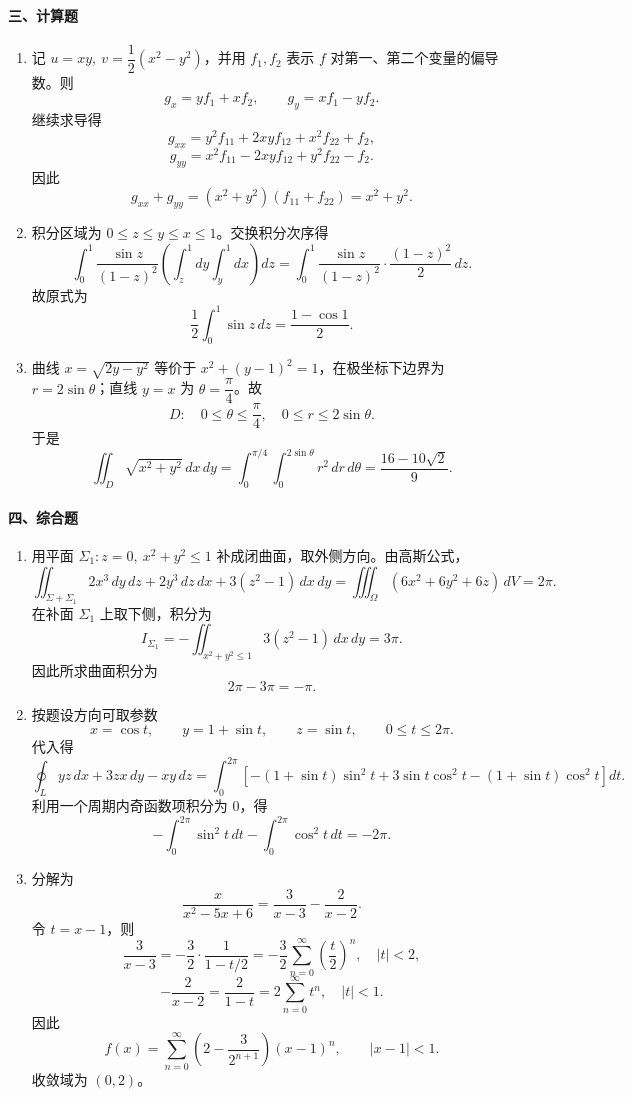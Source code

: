 \paragraph*{三、计算题}
\begin{enumerate}
  \item 记 $u=xy,\ v=\dfrac12(x^2-y^2)$，并用 $f_1,f_2$ 表示 $f$ 对第一、第二个变量的偏导数。则
  \[
    g_x=yf_1+xf_2,\qquad g_y=xf_1-yf_2.
  \]
  继续求导得
  \[
    g_{xx}=y^2f_{11}+2xyf_{12}+x^2f_{22}+f_2,
  \]
  \[
    g_{yy}=x^2f_{11}-2xyf_{12}+y^2f_{22}-f_2.
  \]
  因此
  \[
    g_{xx}+g_{yy}=(x^2+y^2)(f_{11}+f_{22})=x^2+y^2.
  \]
  \item 积分区域为 $0\le z\le y\le x\le 1$。交换积分次序得
  \[
    \int_0^1\frac{\sin z}{(1-z)^2}
    \left(\int_z^1dy\int_y^1dx\right)dz
    =
    \int_0^1\frac{\sin z}{(1-z)^2}\cdot\frac{(1-z)^2}{2}\,dz.
  \]
  故原式为
  \[
    \frac12\int_0^1\sin z\,dz=\frac{1-\cos 1}{2}.
  \]
  \item 曲线 $x=\sqrt{2y-y^2}$ 等价于 $x^2+(y-1)^2=1$，在极坐标下边界为 $r=2\sin\theta$；直线 $y=x$ 为 $\theta=\dfrac{\pi}{4}$。故
  \[
    D:\quad 0\le \theta\le \frac{\pi}{4},\quad 0\le r\le 2\sin\theta.
  \]
  于是
  \[
    \iint_D\sqrt{x^2+y^2}\,dx\,dy
    =
    \int_0^{\pi/4}\int_0^{2\sin\theta}r^2\,dr\,d\theta
    =
    \frac{16-10\sqrt2}{9}.
  \]
\end{enumerate}

\paragraph*{四、综合题}
\begin{enumerate}
  \item 用平面 $\Sigma_1:z=0,\ x^2+y^2\le 1$ 补成闭曲面，取外侧方向。由高斯公式，
  \[
    \iint_{\Sigma+\Sigma_1}2x^3\,dy\,dz+2y^3\,dz\,dx+3(z^2-1)\,dx\,dy
    =
    \iiint_\Omega (6x^2+6y^2+6z)\,dV=2\pi.
  \]
  在补面 $\Sigma_1$ 上取下侧，积分为
  \[
    I_{\Sigma_1}=-\iint_{x^2+y^2\le 1}3(z^2-1)\,dx\,dy=3\pi.
  \]
  因此所求曲面积分为
  \[
    2\pi-3\pi=-\pi.
  \]
  \item 按题设方向可取参数
  \[
    x=\cos t,\qquad y=1+\sin t,\qquad z=\sin t,\qquad 0\le t\le 2\pi.
  \]
  代入得
  \[
    \oint_L yz\,dx+3zx\,dy-xy\,dz
    =
    \int_0^{2\pi}\left[-(1+\sin t)\sin^2t+3\sin t\cos^2t-(1+\sin t)\cos^2t\right]dt.
  \]
  利用一个周期内奇函数项积分为 $0$，得
  \[
    -\int_0^{2\pi}\sin^2t\,dt-\int_0^{2\pi}\cos^2t\,dt=-2\pi.
  \]
  \item 分解为
  \[
    \frac{x}{x^2-5x+6}=\frac{3}{x-3}-\frac{2}{x-2}.
  \]
  令 $t=x-1$，则
  \[
    \frac{3}{x-3}=-\frac32\cdot\frac1{1-t/2}
    =-\frac32\sum_{n=0}^{\infty}\left(\frac{t}{2}\right)^n,\quad |t|<2,
  \]
  \[
    -\frac{2}{x-2}=\frac2{1-t}
    =2\sum_{n=0}^{\infty}t^n,\quad |t|<1.
  \]
  因此
  \[
    f(x)=\sum_{n=0}^{\infty}\left(2-\frac{3}{2^{n+1}}\right)(x-1)^n,
    \qquad |x-1|<1.
  \]
  收敛域为 $(0,2)$。
\end{enumerate}

